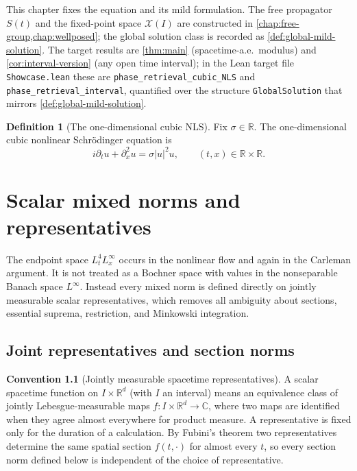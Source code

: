 \documentclass[11pt,oneside]{book}
\theoremstyle{definition}
\newtheorem{definition}[theorem]{Definition}
\newtheorem{convention}[theorem]{Convention}
\theoremstyle{remark}
\newcommand{\R}{\mathbb R}
\newcommand{\C}{\mathbb C}
\newcommand{\1}{\mathbf 1}
\newcommand{\abs}[1]{\left\lvert #1\right\rvert}
\begin{document}
This chapter fixes the equation and its mild formulation. The free propagator $S(t)$ and the
fixed-point space $\mathcal X(I)$ are constructed in \cref{chap:free-group,chap:wellposed}; the
global solution class is recorded as \cref{def:global-mild-solution}. The target results are
\cref{thm:main} (spacetime-a.e.\ modulus) and \cref{cor:interval-version} (any open time
interval); in the Lean target file \texttt{Showcase.lean} these are
\texttt{phase\_retrieval\_cubic\_NLS} and \texttt{phase\_retrieval\_interval}, quantified over
the structure \texttt{GlobalSolution} that mirrors \cref{def:global-mild-solution}.

\begin{definition}[The one-dimensional cubic NLS]\label{def:cubic-nls}
Fix $\sigma\in\R$. The one-dimensional cubic nonlinear Schr\"odinger equation is
\begin{equation}
 i\partial_t u+\partial_x^2 u=\sigma\abs{u}^2u,\qquad(t,x)\in\R\times\R.
 \label{eq:NLS-main}
\end{equation}
\end{definition}

\chapter{Scalar mixed norms and representatives}\label{chap:mixed-norms}

The endpoint space $L^4_tL^\infty_x$ occurs in the nonlinear flow and again in the Carleman argument. It is not treated as a Bochner space with values in the nonseparable Banach space $L^\infty$. Instead every mixed norm is defined directly on jointly measurable scalar representatives, which removes all ambiguity about sections, essential suprema, restriction, and Minkowski integration.

\section{Joint representatives and section norms}

\begin{convention}[Jointly measurable spacetime representatives]\label{conv:joint-representatives}
A scalar spacetime function on $I\times\R^d$ (with $I$ an interval) means an equivalence class of jointly Lebesgue-measurable maps $f:I\times\R^d\to\C$, where two maps are identified when they agree almost everywhere for product measure. A representative is fixed only for the duration of a calculation. By Fubini's theorem two representatives determine the same spatial section $f(t,\cdot)$ for almost every $t$, so every section norm defined below is independent of the choice of representative.
\end{convention}
\end{document}
